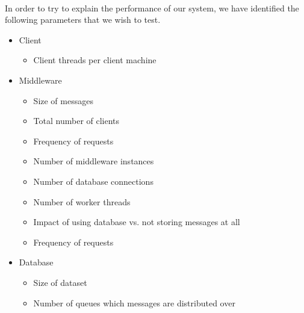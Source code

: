 \documentclass{article}
\begin{document}
        \\
        In order to try to explain the performance of our system, we have identified the following parameters that we wish to test.
        \begin{itemize}
            \item Client
            \begin{itemize}
                \item Client threads per client machine
            \end{itemize}
            \item Middleware
            \begin{itemize}
                \item Size of messages
                \item Total number of clients
                \item Frequency of requests
                \item Number of middleware instances
                \item Number of database connections
                \item Number of worker threads
                \item Impact of using database vs. not storing messages at all
                \item Frequency of requests
            \end{itemize}
            \item Database
            \begin{itemize}
                \item Size of dataset
                \item Number of queues which messages are distributed over
            \end{itemize}
        \end{itemize}
\end{document}
